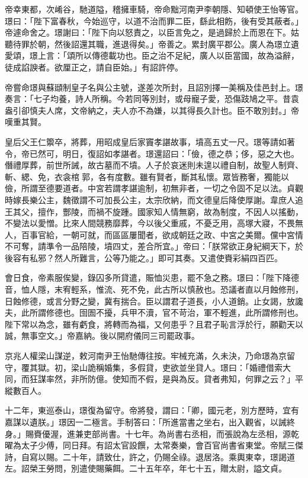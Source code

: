 \begin{pinyinscope}
 帝幸東都，次崤谷，馳道隘，稽擁車騎，帝命黜河南尹李朝隱、知頓使王怡等官。璟曰：「陛下富春秋，今始巡守，以道不治而罪二臣，繇此相飭，後有受其蔽者。」帝遽命舍之。璟謝曰：「陛下向以怒責之，以臣言免之，是過歸於上而恩在下。姑聽待罪於朝，然後詔還其職，進退得矣。」帝善之。累封廣平郡公。廣人為璟立遺愛頌，璟上言：「頌所以傳德載功也。臣之治不足紀，廣人以臣當國，故為溢辭，徒成諂諛者。欲厘正之，請自臣始。」有詔許停。



 帝嘗命璟與蘇頲制皇子名與公主號，遂差次所封，且詔別擇一美稱及佳邑封上。璟奏言：「七子均養，詩人所稱。今若同等別封，或母寵子愛，恐傷跂鳩之平。昔袁盎引卻慎夫人席，文帝納之，夫人亦不為嫌，以其得長久計也。臣不敢別封。」帝嘆重其賢。



 皇后父王仁籞卒，將葬，用昭成皇后家竇孝諶故事，墳高五丈一尺。璟等請如著令，帝已然可，明日，復詔如孝諶者。璟還詔曰：「儉，德之恭；侈，惡之大也。僭禮厚葬，前世所誡，故古墓而不墳。人子於哀迷則未遑以禮自制，故聖人制齊、斬、緦、免，衣衾棺郭，各有度數。雖有賢者，斷其私懷。眾皆務奢，獨能以儉，所謂至德要道者。中宮若謂孝諶逾制，初無非者，一切之令固不足以法。貞觀時嫁長樂公主，魏徵謂不可加長公主，太宗欣納，而文德皇后降使厚謝。韋庶人追王其父，擅作，酆陵，而禍不旋踵。國家知人情無窮，故為制度，不因人以搖動，不變法以愛憎。比來人間競務靡葬，今以後父重戚，不憂乏用，高塚大寢，不畏無人，百事官給，一朝可就，而區區屢聞者，欲成朝廷之政、中宮之美爾。儻中宮情不可奪，請準令一品陪陵，墳四丈，差合所宜。」帝曰：「朕常欲正身紀綱天下，於後容有私邪？然人所難言，公等乃能之。」即可其奏。又遣使賚彩絹四百匹。



 會日食，帝素服俟變，錄囚多所貸遣，賑恤災患，罷不急之務。璟曰：「陛下降德音，恤人隱，末宥輕系，惟流、死不免，此古所以慎赦也。恐議者直以月蝕修刑，日蝕修德，或言分野之變，冀有揣合。臣以謂君子道長，小人道銷。止女謁，放讒夫，此所謂修德也。囹圄不擾，兵甲不瀆，官不苛治，軍不輕進，此所謂修刑也。陛下常以為念，雖有虧食，將轉而為福，又何患乎？且君子恥言浮於行，願勸天以誠，無事空文。」帝嘉納。後以開府儀同三司罷政事。



 京兆人權梁山謀逆，敕河南尹王怡馳傳往按。牢械充滿，久未決，乃命璟為京留守，覆其獄。初，梁山詭稱婚集，多假貸，吏欲並坐貸人。璟曰：「婚禮借索大同，而狂謀率然，非所防億。使知而不假，是與為反。貸者弗知，何罪之云？」平縱數百人。



 十二年，東巡泰山，璟復為留守。帝將發，謂曰：「卿，國元老，別方歷時，宜有嘉謀以遺朕。」璟因一二極言。手制答曰：「所進當書之坐右，出入觀省，以誡終身。」賜賚優渥，進兼吏部尚書。十七年。為尚書右丞相，而張說為左丞相，源乾曜為太子少傅，同日拜。有詔太官設饌，太常奏樂，會百官尚書省東堂。帝賦三傑詩，自寫以賜。二十年，請致仕，許之，仍賜全祿。退居洛。乘輿東幸，璟謁道左。詔榮王勞問，別遣使賜藥餌。二十五年卒，年七十五，贈太尉，謚文貞。




\end{pinyinscope}

